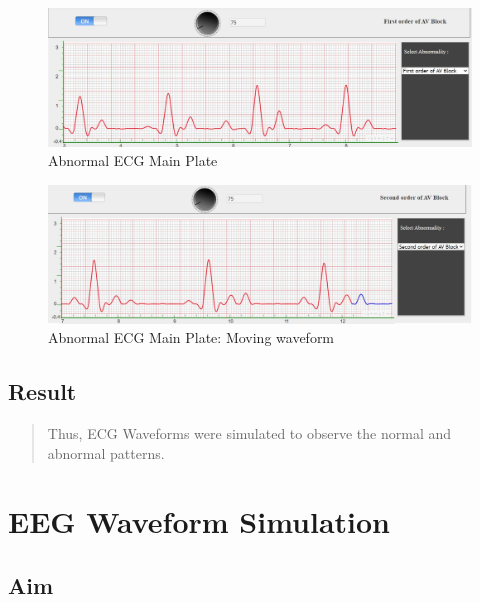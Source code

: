 \documentclass[
  11pt,
  letterpaper,
  DIV=11,
  numbers=noendperiod]{scrreprt}
\begin{document}
\begin{figure}[H]

{\centering \includegraphics{images/clipboard-3470925149.png}

}

\caption{Abnormal ECG Main Plate}

\end{figure}%
\begin{figure}[H]

{\centering \includegraphics{images/clipboard-3576673599.png}

}

\caption{Abnormal ECG Main Plate: Moving waveform}

\end{figure}%

\section{Result}\label{result-4}

\begin{quote}
Thus, ECG Waveforms were simulated to observe the normal and abnormal
patterns.
\end{quote}


\chapter{EEG Waveform Simulation}\label{eeg-waveform-simulation}

\section{Aim}\label{aim-6}
\end{document}
